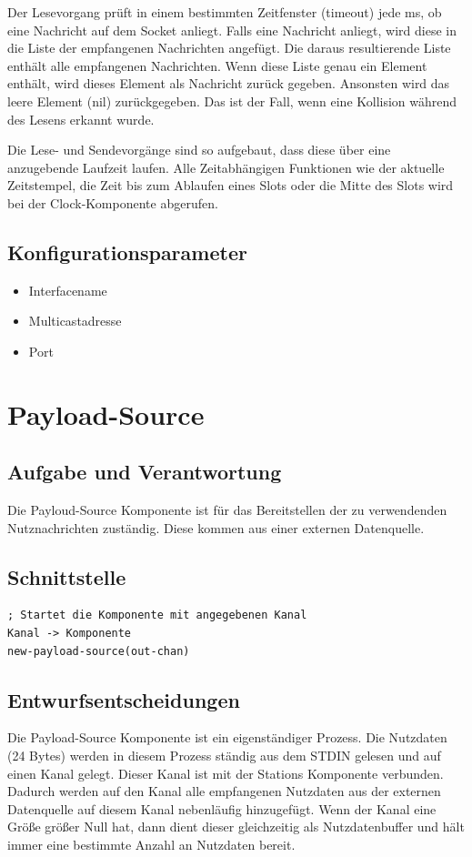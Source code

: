 \documentclass[draft=false
              ,paper=a4
              ,twoside=false
              ,fontsize=11pt
              ,headsepline
              ,BCOR10mm
              ,DIV11
              ]{scrbook}
\begin{document}
Der Lesevorgang prüft in einem bestimmten Zeitfenster (timeout) jede ms, ob eine Nachricht auf dem Socket anliegt. Falls eine Nachricht anliegt, wird diese in die Liste der empfangenen Nachrichten angefügt. Die daraus resultierende Liste enthält alle empfangenen Nachrichten. Wenn diese Liste genau ein Element enthält, wird dieses Element als Nachricht zurück gegeben. Ansonsten wird das leere Element (nil) zurückgegeben. Das ist der Fall, wenn eine Kollision während des Lesens erkannt wurde.

Die Lese- und Sendevorgänge sind so aufgebaut, dass diese über eine anzugebende Laufzeit laufen. Alle Zeitabhängigen Funktionen wie der aktuelle Zeitstempel, die Zeit bis zum Ablaufen eines Slots oder die Mitte des Slots wird bei der Clock-Komponente abgerufen.

\subsection{Konfigurationsparameter}
\begin{itemize}
	\item Interfacename
	\item Multicastadresse
	\item Port
\end{itemize}

\section{Payload-Source}
\subsection{Aufgabe und Verantwortung}
Die Payloud-Source Komponente ist für das Bereitstellen der zu verwendenden Nutznachrichten zuständig. Diese kommen aus einer externen Datenquelle.

\subsection{Schnittstelle}
\begin{lstlisting}
; Startet die Komponente mit angegebenen Kanal
Kanal -> Komponente
new-payload-source(out-chan)
\end{lstlisting}

\subsection{Entwurfsentscheidungen}
Die Payload-Source Komponente ist ein eigenständiger Prozess. Die Nutzdaten (24 Bytes) werden in diesem Prozess ständig aus dem STDIN gelesen und auf einen Kanal gelegt. Dieser Kanal ist mit der Stations Komponente verbunden. Dadurch werden auf den Kanal alle empfangenen Nutzdaten aus der externen Datenquelle auf diesem Kanal nebenläufig hinzugefügt. Wenn der Kanal eine Größe größer Null hat, dann dient dieser gleichzeitig als Nutzdatenbuffer und hält immer eine bestimmte Anzahl an Nutzdaten bereit.
\end{document}
